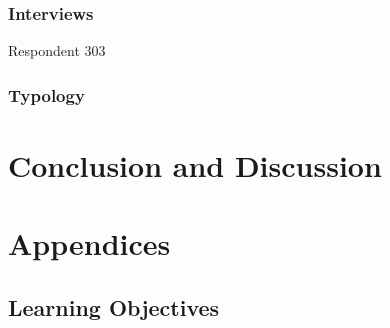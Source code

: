 \documentclass[11pt,twoside]{report} %
\begin{document}
\section{Interviews}

Respondent 303

\section{Typology}

\part{Conclusion and Discussion}




\part{Appendices}

\appendix

\chapter{Learning Objectives}
\label{app:learningobjectives}
\end{document}
